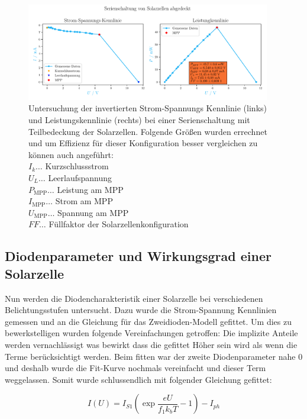 \documentclass[12pt,english,ngerman]{scrartcl}
\begin{document}
\begin{figure}[H]
	\centering
	\includegraphics[width=0.95\textwidth]{figures/serienschaltungAbgedeckt.pdf}
	\caption[Kennlinien Serienschaltung mit teils bedeckten Solarzellen]{Untersuchung der
		invertierten Strom-Spannungs Kennlinie (links) und Leistungskennlinie (rechts)
		bei einer Serienschaltung mit Teilbedeckung der Solarzellen. Folgende Größen
		wurden errechnet und um Effizienz für dieser Konfiguration besser vergleichen
		zu können auch angeführt:            \\
		$I_k \dots$ Kurzschlussstrom         \\
		$U_L \dots$ Leerlaufspannung         \\
		$P_\text{MPP} \dots$ Leistung am MPP \\
		$I_\text{MPP} \dots$ Strom am MPP    \\
		$U_\text{MPP} \dots$ Spannung am MPP \\
		$FF \dots$ Füllfaktor der Solarzellenkonfiguration
	}\label{fig:auws_kennlinie_abgedeckt}
\end{figure}

\subsection{Diodenparameter und Wirkungsgrad einer Solarzelle}

Nun werden die Diodencharakteristik einer Solarzelle bei verschiedenen
Belichtungsstufen untersucht. Dazu wurde die Strom-Spannung Kennlinien gemessen
und an die Gleichung für das Zweidioden-Modell gefittet. Um dies zu
bewerkstelligen wurden folgende Vereinfachungen getroffen: Die implizite
Anteile werden vernachlässigt was bewirkt dass die gefittet Höher sein wird als
wenn die Terme berücksichtigt werden. Beim fitten war der zweite
Diodenparameter nahe 0 und deshalb wurde die Fit-Kurve nochmals vereinfacht und
dieser Term weggelassen. Somit wurde schlussendlich mit folgender Gleichung
gefittet:

\begin{equation}
	I(U) = I_{S1} \left( \exp{\frac{eU}{f_1 k_b T}} -1 \right) - I_{ph}
	\label{eq:kennlinienFit}
\end{equation}
\end{document}
